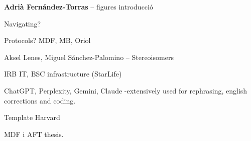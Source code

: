 

\textbf{Adrià Fernández-Torras} -- figures introducció

Navigating?

Protocols? MDF, MB, Oriol


Aksel Lenes, Miguel Sánchez-Palomino -- Stereoisomers



IRB IT, BSC infrastructure (StarLife)


ChatGPT, Perplexity, Gemini, Claude -extensively used for rephrasing, english corrections and coding. 


Template Harvard

MDF i AFT thesis. 